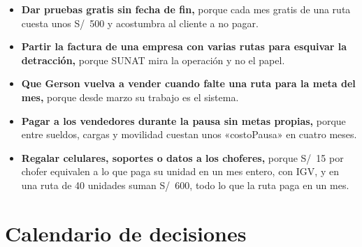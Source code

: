 \documentclass[10.5pt,a4paper]{article}
\begin{document}
\begin{itemize}
\item \textbf{Dar pruebas gratis sin fecha de fin,} porque cada mes gratis de una ruta cuesta unos S/~500 y acostumbra al cliente a no pagar.
\item \textbf{Partir la factura de una empresa con varias rutas para esquivar la detracción,} porque SUNAT mira la operación y no el papel.
\item \textbf{Que Gerson vuelva a vender cuando falte una ruta para la meta del mes,} porque desde marzo su trabajo es el sistema.
\item \textbf{Pagar a los vendedores durante la pausa sin metas propias,} porque entre sueldos, cargas y movilidad cuestan unos «costoPausa» en cuatro meses.
\item \textbf{Regalar celulares, soportes o datos a los choferes,} porque S/~15 por chofer equivalen a lo que paga su unidad en un mes entero, con IGV, y en una ruta de 40 unidades suman S/~600, todo lo que la ruta paga en un mes.
\end{itemize}

\section{Calendario de decisiones}
\end{document}
